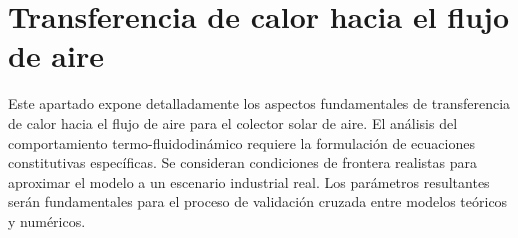 \section{Transferencia de calor hacia el flujo de aire}
\label{sec:cap06_transferencia}

Este apartado expone detalladamente los aspectos fundamentales de transferencia de calor hacia el flujo de aire para el colector solar de aire.
El análisis del comportamiento termo-fluidodinámico requiere la formulación de ecuaciones constitutivas específicas.
Se consideran condiciones de frontera realistas para aproximar el modelo a un escenario industrial real.
Los parámetros resultantes serán fundamentales para el proceso de validación cruzada entre modelos teóricos y numéricos.
